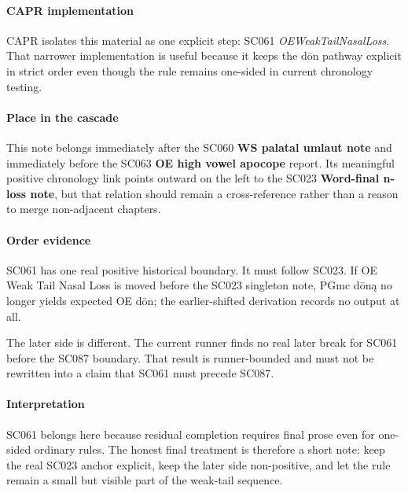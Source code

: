 \documentclass[
  british,
  a4paper,
]{article}
\begin{document}
\paragraph{CAPR implementation}\label{capr-implementation-39}

CAPR isolates this material as one explicit step: SC061
\emph{OEWeakTailNasalLoss}. That narrower implementation is useful
because it keeps the dōn pathway explicit in strict order even though
the rule remains one-sided in current chronology testing.

\paragraph{Place in the cascade}\label{place-in-the-cascade-39}

This note belongs immediately after the SC060 \textbf{WS palatal umlaut
note} and immediately before the SC063 \textbf{OE high vowel apocope}
report. Its meaningful positive chronology link points outward on the
left to the SC023 \textbf{Word-final n-loss note}, but that relation
should remain a cross-reference rather than a reason to merge
non-adjacent chapters.

\paragraph{Order evidence}\label{order-evidence-39}

SC061 has one real positive historical boundary. It must follow SC023.
If OE Weak Tail Nasal Loss is moved before the SC023 singleton note,
PGmc dōną no longer yields expected OE dōn; the earlier-shifted
derivation records no output at all.

The later side is different. The current runner finds no real later
break for SC061 before the SC087 boundary. That result is runner-bounded
and must not be rewritten into a claim that SC061 must precede SC087.

\paragraph{Interpretation}\label{interpretation-39}

SC061 belongs here because residual completion requires final prose even
for one-sided ordinary rules. The honest final treatment is therefore a
short note: keep the real SC023 anchor explicit, keep the later side
non-positive, and let the rule remain a small but visible part of the
weak-tail sequence.
\end{document}
